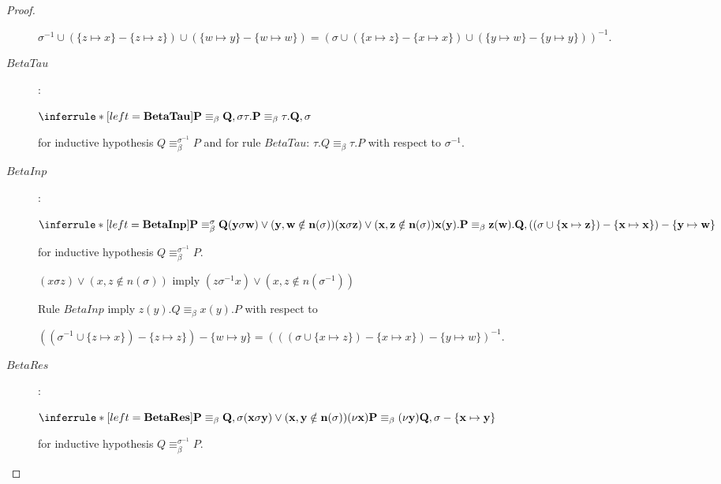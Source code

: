 \begin{lemma}
\begin{proof}
\begin{description}
	\begin{center}
	  $\sigma^{-1} \cup (\{z\mapsto x\}-\{z\mapsto z\}) \cup (\{w\mapsto y\}-\{w\mapsto w\})=(\sigma \cup (\{x\mapsto z\}-\{x\mapsto x\}) \cup (\{y\mapsto w\}-\{y\mapsto y\}))^{-1}$.
	\end{center}
      \item[$BetaTau$]:
	\begin{center}
	  $\inferrule*[left=\bf{BetaTau}]{
	      P\equiv_{\beta}Q,
	    \\
	      \sigma
	  }{
	      \tau.P\equiv_{\beta}\tau.Q,
	    \\
	      \sigma
	  }$
	\end{center}
	for inductive hypothesis $Q\equiv_{\beta}^{\sigma^{-1}}P$ and for rule $BetaTau$: $\tau.Q\equiv_{\beta}\tau.P$ with respect to $\sigma^{-1}$.
      \item[$BetaInp$]:
	\begin{center}
	  $\inferrule*[left=\bf{BetaInp}]{
	      P\equiv_{\beta}^{\sigma}Q
	    \\
	      (y\sigma w) \vee (y,w\notin n(\sigma))
	    \\
	      (x\sigma z) \vee (x,z\notin n(\sigma))
	  }{
	      x(y).P\equiv_{\beta}z(w).Q,
	    \\
	      ((\sigma \cup \{x\mapsto z\})-\{x\mapsto x\})- \{y\mapsto w\}
	  }$
	\end{center}
	for inductive hypothesis $Q\equiv_{\beta}^{\sigma^{-1}}P$. 
	\begin{center}
	  $(x\sigma z) \vee (x,z\notin n(\sigma))$ imply $(z\sigma^{-1} x) \vee (x,z\notin n(\sigma^{-1}))$
	\end{center}
	Rule $BetaInp$ imply $z(y).Q\equiv_{\beta} x(y).P$ with respect to 
	\begin{center}
	  $((\sigma^{-1} \cup \{z\mapsto x\})-\{z\mapsto z\})- \{w\mapsto y\}=(((\sigma \cup \{x\mapsto z\})-\{x\mapsto x\})- \{y\mapsto w\})^{-1}$.
	\end{center}
      \item[$BetaRes$]:
	\begin{center}
	  $\inferrule*[left=\bf{BetaRes}]{
	      P\equiv_{\beta}Q,
	    \\
	      \sigma
	    \\
	      (x\sigma y) \vee (x,y\notin n(\sigma))
	  }{
	      (\nu x)P\equiv_{\beta}(\nu y)Q,
	    \\
	      \sigma - \{x\mapsto y\}
	  }$
	\end{center}
	for inductive hypothesis $Q\equiv_{\beta}^{\sigma^{-1}}P$. 

\end{description}
\end{proof}
\end{lemma}
